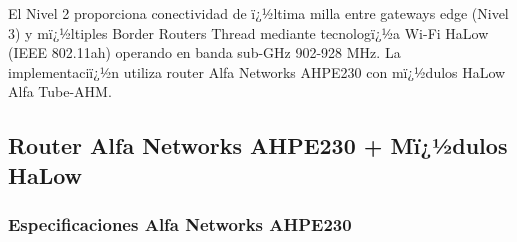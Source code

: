 El Nivel 2 proporciona conectividad de ï¿½ltima milla entre gateways edge (Nivel 3) y mï¿½ltiples Border Routers Thread mediante tecnologï¿½a Wi-Fi HaLow (IEEE 802.11ah) operando en banda sub-GHz 902-928 MHz. La implementaciï¿½n utiliza router Alfa Networks AHPE230 con mï¿½dulos HaLow Alfa Tube-AHM.

\subsection{Router Alfa Networks AHPE230 + Mï¿½dulos HaLow}
\label{sec:impl-halow-hardware}

\subsubsection{Especificaciones Alfa Networks AHPE230}

